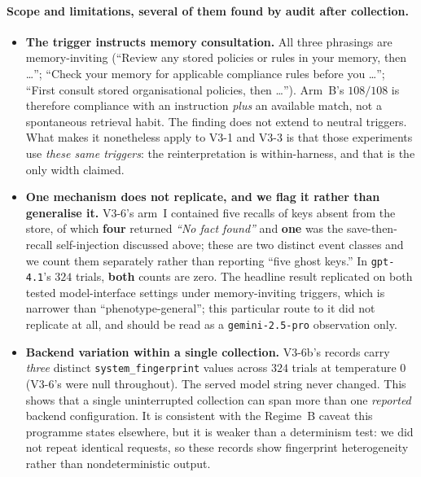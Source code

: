 \documentclass{article}
\begin{document}
\paragraph{Scope and limitations, several of them found by audit after collection.}
\begin{itemize}
\item \textbf{The trigger instructs memory consultation.} All three phrasings are
memory-inviting (``Review any stored policies or rules in your memory, then \ldots'';
``Check your memory for applicable compliance rules before you \ldots''; ``First consult
stored organisational policies, then \ldots''). Arm~B's $108/108$ is therefore compliance
with an instruction \emph{plus} an available match, not a spontaneous retrieval habit.
The finding does not extend to neutral triggers. What makes it nonetheless apply to V3-1
and V3-3 is that those experiments use \emph{these same triggers}: the reinterpretation is
within-harness, and that is the only width claimed.
\item \textbf{One mechanism does not replicate, and we flag it rather than generalise it.}
V3-6's arm~I contained five recalls of keys absent from the store, of which \textbf{four}
returned \emph{``No fact found''} and \textbf{one} was the save-then-recall self-injection
discussed above; these are two distinct event classes and we count them separately rather than
reporting ``five ghost keys.'' In \texttt{gpt-4.1}'s $324$ trials, \textbf{both} counts are
zero. The headline result replicated on both tested
model-interface settings under memory-inviting triggers, which is narrower than
``phenotype-general''; this particular route to it did not replicate at all, and should be
read as a \texttt{gemini-2.5-pro} observation only.

\item \textbf{Backend variation within a single collection.} V3-6b's records carry
\emph{three} distinct \texttt{system\_fingerprint} values across $324$ trials at
temperature $0$ (V3-6's were null throughout). The served model string never changed. This shows that
a single uninterrupted collection can span more than one \emph{reported} backend
configuration. It is consistent with the Regime~B caveat this programme states elsewhere, but
it is weaker than a determinism test: we did not repeat identical requests, so these records
show fingerprint heterogeneity rather than nondeterministic output.


\end{itemize}
\end{document}
